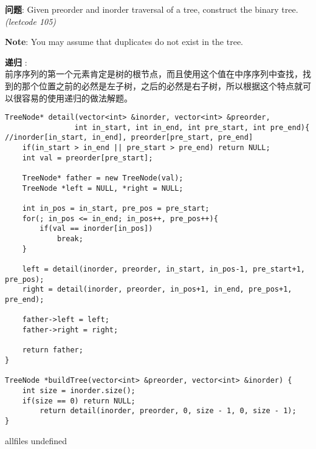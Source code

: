 \documentclass{article}
\begin{document}
\begin{CJK}{UTF8}{gbsn}     %

\else
    
\begin{description}
    \item{\textbf{问题}}: Given preorder and inorder traversal of a tree, construct the binary tree. \textit{(leetcode 105)}
    \item{\textbf{Note}}: You may assume that duplicates do not exist in the tree.
    \item{\textbf{递归}} : 
    \\前序序列的第一个元素肯定是树的根节点，而且使用这个值在中序序列中查找，找到的那个位置之前的必然是左子树，之后的必然是右子树，所以根据这个特点就可以很容易的使用递归的做法解题。
    \begin{lstlisting}
TreeNode* detail(vector<int> &inorder, vector<int> &preorder, 
                int in_start, int in_end, int pre_start, int pre_end){
//inorder[in_start, in_end], preorder[pre_start, pre_end]
    if(in_start > in_end || pre_start > pre_end) return NULL;
    int val = preorder[pre_start];

    TreeNode* father = new TreeNode(val);
    TreeNode *left = NULL, *right = NULL;
        
    int in_pos = in_start, pre_pos = pre_start;
    for(; in_pos <= in_end; in_pos++, pre_pos++){
        if(val == inorder[in_pos])
            break;
    }

    left = detail(inorder, preorder, in_start, in_pos-1, pre_start+1, pre_pos);
    right = detail(inorder, preorder, in_pos+1, in_end, pre_pos+1, pre_end);

    father->left = left;
    father->right = right;

    return father;
}

TreeNode *buildTree(vector<int> &preorder, vector<int> &inorder) {
    int size = inorder.size();
    if(size == 0) return NULL;
        return detail(inorder, preorder, 0, size - 1, 0, size - 1);
}
    \end{lstlisting}
    \textit{}
\end{description}

\fi

\ifx allfiles undefined
\end{CJK}
\end{document}
